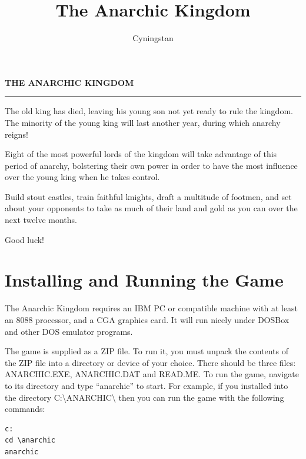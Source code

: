 \documentclass[8pt]{extarticle}
\author{Cyningstan}
\title{The Anarchic Kingdom}
\begin{document}
%
%

\noindent
\begin{center}
\Large \textbf{\uppercase{The Anarchic Kingdom}}
\end{center}
\hrule

%
%

\begin{multicols}{2}
\noindent
The old king has died, leaving his young son not yet ready to rule the kingdom. The minority of the young king will last another year, during which anarchy reigns!

Eight of the most powerful lords of the kingdom will take advantage of this period of anarchy, bolstering their own power in order to have the most influence over the young king when he takes control.

Build stout castles, train faithful knights, draft a multitude of footmen, and set about your opponents to take as much of their land and gold as you can over the next twelve months.

Good luck!
\end{multicols}

%
%

\section*{Installing and Running the Game}

\begin{multicols}{2}
\noindent
The Anarchic Kingdom requires an IBM PC or compatible machine with at least an 8088 processor, and a CGA graphics card. It will run nicely under DOSBox and other DOS emulator programs.

The game is supplied as a ZIP file. To run it, you must unpack the contents of the ZIP file into a directory or device of your choice. There should be three files: ANARCHIC.EXE, ANARCHIC.DAT and READ.ME. To run the game, navigate to its directory and type ``anarchic'' to start. For example, if you installed into the directory C:{\textbackslash}ANARCHIC{\textbackslash} then you can run the game with the following commands:

\begin{verbatim}
c:
cd \anarchic
anarchic
\end{verbatim}
\end{multicols}

%
%

\pagebreak %
\end{document}
